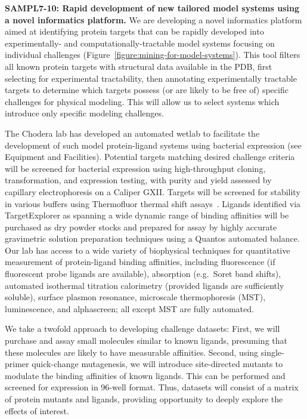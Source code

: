 \documentclass[11pt]{article}
\begin{document}
\textbf{SAMPL7-10: Rapid development of new tailored model systems using a novel informatics platform.} We are developing a novel informatics platform aimed at identifying protein targets that can be rapidly developed into experimentally- and computationally-tractable model systems focusing on individual challenges (Figure~\ref{figure:mining-for-model-systems}).
This tool filters all known protein targets with structural data available in the PDB, first selecting for experimental tractability, then annotating experimentally tractable targets to determine which targets possess (or are likely to be free of) specific challenges for physical modeling.
This will allow us to select systems which introduce only specific modeling challenges.

The Chodera lab has developed an automated wetlab to facilitate the development of such model protein-ligand systems using bacterial expression (see Equipment and Facilities).
Potential targets matching desired challenge criteria will be screened for bacterial expression using high-throughput cloning, transformation, and expression testing, with purity and yield assessed by capillary electrophoresis on a Caliper GXII.
Targets will be screened for stability in various buffers using Thermofluor thermal shift assays~\cite{Reinhard:2013:ActaCrystallographicaSectionFStructuralBiologyandCrystallizationCommunications}.
Ligands identified via TargetExplorer as spanning a wide dynamic range of binding affinities will be purchased as dry powder stocks and prepared for assay by highly accurate gravimetric solution preparation techniques using a Quantos automated balance.
Our lab has access to a wide variety of biophysical techniques for quantitative measurement of protein-ligand binding affinities, including fluorescence (if fluorescent probe ligands are available), absorption (e.g.~Soret band shifts), automated isothermal titration calorimetry (provided ligands are sufficiently soluble), surface plasmon resonance, microscale thermophoresis (MST), luminescence, and alphascreen; all except MST are fully automated. 

We take a twofold approach to developing challenge datasets:
First, we will purchase and assay small molecules similar to known ligands, presuming that these molecules are likely to have measurable affinities.
Second, using single-primer quick-change mutagenesis, we will introduce site-directed mutants to modulate the binding affinities of known ligands.
This can be performed and screened for expression in 96-well format.
Thus, datasets will consist of a matrix of protein mutants and ligands, providing opportunity to deeply explore the effects of interest.
\end{document}
